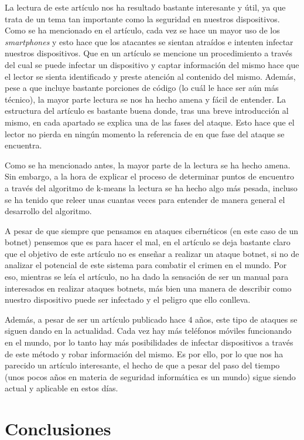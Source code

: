 \documentclass[a4paper,11pt]{report}
\begin{document}
La lectura de este artículo nos ha resultado bastante interesante y útil, ya que trata de un tema tan importante como la seguridad en nuestros dispositivos. Como se ha mencionado en el artículo, cada vez se hace un mayor uso de los \emph{smartphones} y esto hace que los atacantes se sientan atraídos e intenten infectar nuestros dispositivos. Que en un artículo se mencione un procedimiento a través del cual se puede infectar un dispositivo y captar información del mismo hace que el lector se sienta identificado y preste atención al contenido del mismo. Además, pese a que incluye bastante porciones de código (lo cuál le hace ser aún más técnico), la mayor parte lectura se nos ha hecho amena y fácil de entender. La estructura del artículo es bastante buena donde, tras una breve introducción al mismo, en cada apartado se explica una de las fases del ataque. Esto hace que el lector no pierda en ningún momento la referencia de en que fase del ataque se encuentra. 

Como se ha mencionado antes, la mayor parte de la lectura se ha hecho amena. Sin embargo, a la hora de explicar el proceso de determinar puntos de encuentro a través del algoritmo de k-means la lectura se ha hecho algo más pesada, incluso se ha tenido que releer unas cuantas veces para entender de manera general el desarrollo del algoritmo. 

A pesar de que siempre que pensamos en ataques cibernéticos (en este caso de un botnet) pensemos que es para hacer el mal, en el artículo se deja bastante claro que el objetivo de este artículo no es enseñar a realizar un ataque botnet, si no de analizar el potencial de este sistema para combatir el crimen en el mundo. Por eso, mientras se leía el artículo, no ha dado la sensación de ser un manual para interesados en realizar ataques botnets, más bien una manera de describir como nuestro dispositivo puede ser infectado y el peligro que ello conlleva.

Además, a pesar de ser un artículo publicado hace 4 años, este tipo de ataques se siguen dando en la actualidad. Cada vez hay más teléfonos móviles funcionando en el mundo, por lo tanto hay más posibilidades de infectar dispositivos a través de este método y robar información del mismo. Es por ello, por lo que nos ha parecido un artículo interesante, el hecho de que a pesar del paso del tiempo (unos pocos años en materia de seguridad informática es un mundo) sigue siendo actual y aplicable en estos días.


\chapter{Conclusiones}
\end{document}

